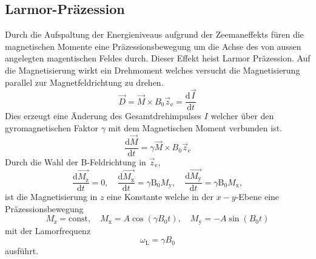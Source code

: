 \subsection{Larmor-Präzession}%
\label{sub:larmor_praezession}
Durch die Aufspaltung der Energieniveaus aufgrund der Zeemaneffekts füren
die magnetischen Momente eine Präzessionsbewegung um die Achse des von aussen
angelegten magentischen Feldes durch. 
Dieser Effekt heist Larmor Präzession. 
Auf die Magnetisierung wirkt ein Drehmoment welches versucht die Magnetisierung
parallel zur Magnetfeldrichtung zu drehen.
\begin{equation}
		\label{eq:dreh}
		\vec{D} = \vec{M} \times B_0 \vec{z}_\text{e} = \frac{\text{d} \vec{I}}{\text{d}t} 
\end{equation}
Dies erzeugt eine Änderung des Gesamtdrehimpulses $I$ welcher über den
gyromagnetischen Faktor $\gamma$ mit dem Magnetischen Moment verbunden ist.
\begin{equation}
		\label{eq:dreh}
		\frac{\text{d} \vec{M}}{\text{d}t} = \gamma \vec{M} \times B_0
		\vec{z}_\text{e}
\end{equation}
Durch die Wahl der B-Feldrichtung in $\vec{z}_\text{e}$,
\begin{equation}
		\label{eq:ablM}
		\frac{\text{d} \vec{M_\text{z}}}{\text{d}t} = 0 ,  \hspace{1em}
		\frac{\text{d} \vec{M_\text{x}}}{\text{d}t} = \gamma \text{B}_0
		M_\text{y}, \hspace{1em}
		\frac{\text{d} \vec{M_\text{y}}}{\text{d}t} = \gamma \text{B}_0
		M_\text{x}, 
\end{equation}
 ist die Magnetisierung in $z$ eine Konstante welche in der $x-y$-Ebene
 eine Präzessionsbewegung 
\begin{equation}
		\label{eq:schwM}
		M_\text{z} = \text{const}, \hspace{1em} M_\text{x} = A \cos(\gamma B_0
		t ), \hspace{1em} M_\text{y} = -A \sin(B_0 t)
\end{equation}
mit der Lamorfrequenz
\begin{equation}
		\label{eq:larmorf}
		\omega_\text{L} = \gamma B_0
\end{equation}
ausführt. 

